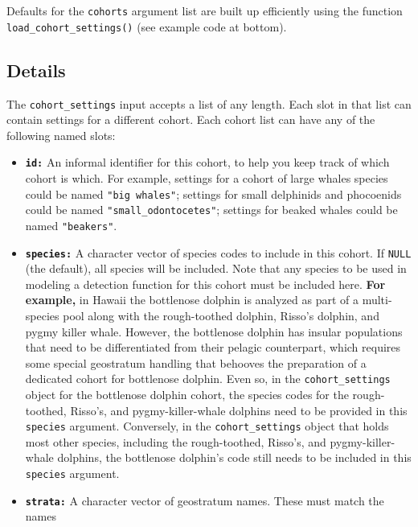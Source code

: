 \documentclass[
]{book}
\begin{document}
Defaults for the \texttt{cohorts} argument list are built up efficiently using the function \texttt{load\_cohort\_settings()} (see example code at bottom).

\hypertarget{details-1}{%
\subsection*{Details}\label{details-1}}

The \texttt{cohort\_settings} input accepts a list of any length. Each slot in that list can contain settings for a different cohort. Each cohort list can have any of the following named slots:

\begin{itemize}
\item
  \textbf{\texttt{id:}} An informal identifier for this cohort, to help you keep track of which cohort is which. For example, settings for a cohort of large whales species could be named \texttt{"big\ whales"}; settings for small delphinids and phocoenids could be named \texttt{"small\_odontocetes"}; settings for beaked whales could be named \texttt{"beakers"}.
\item
  \textbf{\texttt{species:}} A character vector of species codes to include in this cohort. If \texttt{NULL} (the default), all species will be included. Note that any species to be used in modeling a detection function for this cohort must be included here. \textbf{For example,} in Hawaii the bottlenose dolphin is analyzed as part of a multi-species pool along with the rough-toothed dolphin, Risso's dolphin, and pygmy killer whale. However, the bottlenose dolphin has insular populations that need to be differentiated from their pelagic counterpart, which requires some special geostratum handling that behooves the preparation of a dedicated cohort for bottlenose dolphin. Even so, in the \texttt{cohort\_settings} object for the bottlenose dolphin cohort, the species codes for the rough-toothed, Risso's, and pygmy-killer-whale dolphins need to be provided in this \texttt{species} argument. Conversely, in the \texttt{cohort\_settings} object that holds most other species, including the rough-toothed, Risso's, and pygmy-killer-whale dolphins, the bottlenose dolphin's code still needs to be included in this \texttt{species} argument.
\item
  \textbf{\texttt{strata:}} A character vector of geostratum names. These must match the names

\end{itemize}
\end{document}
